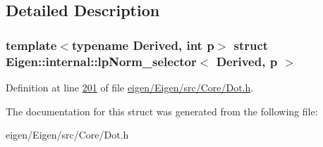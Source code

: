 \subsection{Detailed Description}
\subsubsection*{template$<$typename Derived, int p$>$\newline
struct Eigen\+::internal\+::lp\+Norm\+\_\+selector$<$ Derived, p $>$}



Definition at line \hyperlink{eigen_2_eigen_2src_2_core_2_dot_8h_source_l00201}{201} of file \hyperlink{eigen_2_eigen_2src_2_core_2_dot_8h_source}{eigen/\+Eigen/src/\+Core/\+Dot.\+h}.



The documentation for this struct was generated from the following file\+:\begin{DoxyCompactItemize}
\item 
eigen/\+Eigen/src/\+Core/\+Dot.\+h\end{DoxyCompactItemize}
